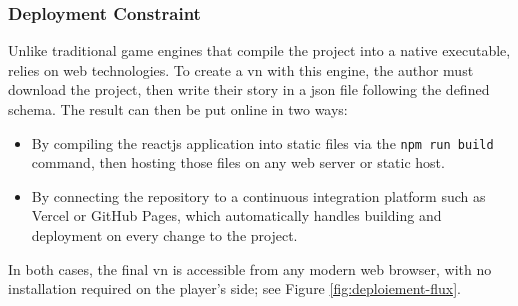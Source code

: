 \subsubsection{Deployment Constraint}

Unlike traditional game engines that compile the project into a native executable, \nsits relies on web technologies. To create a \gls{vn} with this engine, the author must download the project, then write their story in a \gls{json} file following the defined \gls{schema}. The result can then be put online in two ways:

\begin{itemize}
    \item By compiling the \gls{reactjs} application into static files via the \texttt{npm run build} command, then hosting those files on any web server or static host.
    \item By connecting the repository to a continuous integration platform such as Vercel or GitHub Pages, which automatically handles building and deployment on every change to the project.
\end{itemize}

In both cases, the final \gls{vn} is accessible from any modern web browser, with no installation required on the player's side; see Figure \ref{fig:deploiement-flux}.

